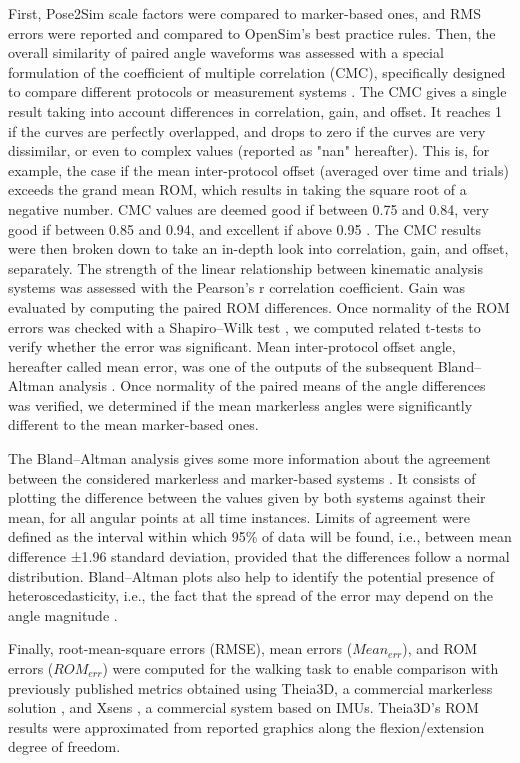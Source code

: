 First, Pose2Sim scale factors were compared to marker-based ones, and RMS errors were reported and compared to OpenSim’s best practice rules. Then, the overall similarity of paired angle waveforms was assessed with a special formulation of the coefficient of multiple correlation (CMC), specifically designed to compare different protocols or measurement systems \cite{Ferrari2010}. The CMC gives a single result taking into account differences in correlation, gain, and offset. It reaches 1 if the curves are perfectly overlapped, and drops to zero if the curves are very dissimilar, or even to complex values (reported as "nan" hereafter). This is, for example, the case if the mean inter-protocol offset (averaged over time and trials) exceeds the grand mean ROM, which results in taking the square root of a negative number. CMC values are deemed good if between 0.75 and 0.84, very good if between 0.85 and 0.94, and excellent if above 0.95 \cite{Ferrari2010}. The CMC results were then broken down to take an in-depth look into correlation, gain, and offset, separately. The strength of the linear relationship between kinematic analysis systems was assessed with the Pearson’s r correlation coefficient. Gain was evaluated by computing the paired ROM differences. Once normality of the ROM errors was checked with a Shapiro–Wilk test \cite{Shapiro1965}, we computed related t-tests to verify whether the error was significant. Mean inter-protocol offset angle, hereafter called mean error, was one of the outputs of the subsequent Bland–Altman analysis \cite{Bland1986,Atkinson1998}. Once normality of the paired means of the angle differences was verified, we determined if the mean markerless angles were significantly different to the mean marker-based ones.

The Bland–Altman analysis gives some more information about the agreement between the considered markerless and marker-based systems \cite{Bland1986,Atkinson1998}. It consists of plotting the difference between the values given by both systems against their mean, for all angular points at all time instances. Limits of agreement were defined as the interval within which 95\% of data will be found, i.e., between mean difference ±1.96 standard deviation, provided that the differences follow a normal distribution. Bland–Altman plots also help to identify the potential presence of heteroscedasticity, i.e., the fact that the spread of the error may depend on the angle magnitude \cite{Atkinson1998}.

Finally, root-mean-square errors (RMSE), mean errors (\(Mean_{err}\)), and ROM errors (\(ROM_{err}\)) were computed for the walking task to enable comparison with previously published metrics obtained using Theia3D, a commercial markerless solution \cite{Kanko2021b}, and Xsens \cite{Zhang2013}, a commercial system based on IMUs. Theia3D’s ROM results were approximated from reported graphics along the flexion/extension degree of freedom.


